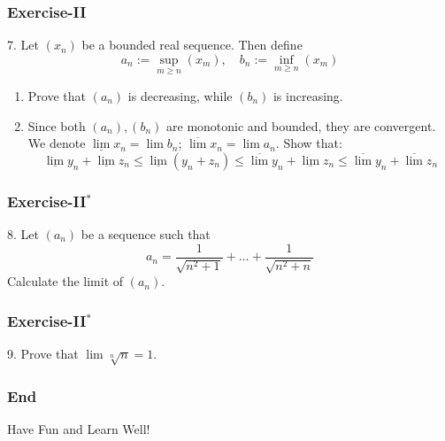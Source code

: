 \documentclass[12pt, t]{beamer}
\begin{document}
\begin{frame}
    \frametitle{Exercise-II}
7. Let $(x_n)$ be a bounded real sequence. Then define
\begin{equation*}
     a_n:=\sup_{m\geq n}(x_m),\quad b_n:=\inf_{m\geq n}(x_m) 
\end{equation*}

\begin{enumerate}
    \item Prove that $(a_n)$ is decreasing, while $(b_n)$ is increasing.
    \item Since both $(a_n),(b_n)$ are monotonic and bounded, they are convergent. 
        We denote $\underline{\lim} x_n=\lim b_n$; $\overline{\lim}x_n=\lim a_n$. Show that:
        \begin{equation*}
            \underline{\lim}y_n+\underline{\lim}z_n\leq \underline{\lim} (y_n+z_n)\leq\overline{\lim}y_n+\underline{\lim}z_n\leq\overline{\lim}y_n+\overline{\lim}z_n
        \end{equation*}
\end{enumerate}
\end{frame}

\begin{frame}
    \frametitle{Exercise-II$^*$}
8. Let $(a_n)$ be a sequence such that 
\begin{equation*}
    a_n=\frac{1}{\sqrt{n^2+1}}+\dots+\frac{1}{\sqrt{n^2+n}}
\end{equation*}
Calculate the limit of $(a_n)$.
\end{frame}

\begin{frame}
    \frametitle{Exercise-II$^*$}
9. Prove that $\lim \sqrt[n]{n}=1$.
\end{frame}

\begin{frame}
    \frametitle{End}
    \vspace{2cm}
    \Huge \center  Have Fun and Learn Well!
\end{frame}
\end{document}
